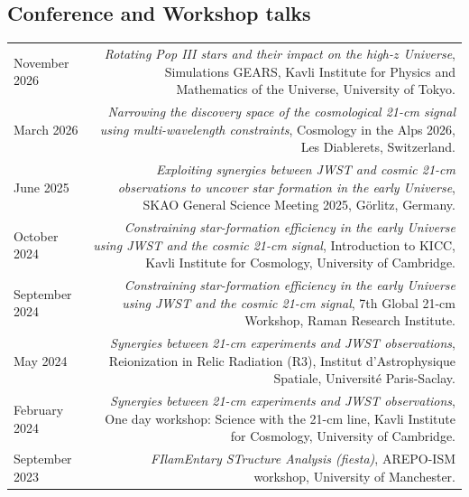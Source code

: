 \documentclass{article}
\begin{document}
\subsection*{Conference and Workshop talks}
\begin{longtable}{L!{\vrule}R}

    November 2026 & \textit{Rotating Pop III stars and their impact on the high-$z$ Universe}, Simulations GEARS, Kavli Institute for Physics and Mathematics of the Universe, University of Tokyo. \\

    March 2026 & \textit{Narrowing the discovery space of the cosmological 21-cm signal using multi-wavelength constraints}, Cosmology in the Alps 2026, Les Diablerets, Switzerland. \\

    June 2025 & \textit{Exploiting synergies between JWST and cosmic 21-cm observations to uncover star formation in the early Universe}, SKAO General Science Meeting 2025, Görlitz, Germany. \\

    October 2024 & \textit{Constraining star-formation efficiency in the early Universe using JWST and the cosmic 21-cm signal}, Introduction to KICC, Kavli Institute for Cosmology, University of Cambridge. \\

    September 2024 & \textit{Constraining star-formation efficiency in the early Universe using JWST and the cosmic 21-cm signal}, 7th Global 21-cm Workshop, Raman Research Institute. \\

    May 2024 & \textit{Synergies between 21-cm experiments and JWST observations}, Reionization in Relic Radiation (R3), Institut d'Astrophysique Spatiale, Université Paris-Saclay. \\

    February 2024 & \textit{Synergies between 21-cm experiments and JWST observations}, One day workshop: Science with the 21-cm line, Kavli Institute for Cosmology, University of Cambridge. \\

    September 2023 & \textit{FIlamEntary STructure Analysis (fiesta)}, AREPO-ISM workshop, University of Manchester. \\

\end{longtable}
\end{document}
